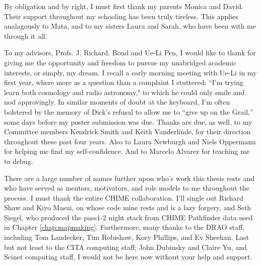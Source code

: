 \begin{acknowledgements}

By obligation and by right, I must first thank my parents Monica and David. Their support throughout my schooling has been truly tireless. This applies analagously to Mata, and to my sisters Laura and Sarah, who have been with me through it all.

To my advisors, Profs. J. Richard. Bond and Ue-Li Pen, I would like to thank for giving me the opportunity and freedom to pursue my unabridged academic interests, or simply, my dream. I recall a early morning meeting with Ue-Li in my first year, where more as a question than a complaint I stuttered: ``I'm trying learn both cosmology and radio astronomy," to which he could only smile and nod approvingly. In similar moments of doubt at the keyboard, I'm often bolstered by the memory of Dick's refusal to allow me to ``give up on the Grail,'' some days before my poster submission was due. Thanks are due, as well, to my Committee members Kendrick Smith and Keith Vanderlinde, for their direction throughout these past four years. Also to Laura Newburgh and Niels Oppermann for helping me find my self-confidence. And to Marcelo Alvarez for teaching me to debug.

There are a large number of names further upon who's work this thesis rests and who have served as mentors, motivators, and role models to me throughout the process. I must thank the entire CHIME collaboration. I'll single out Richard Shaw and Kiyo Masui, on whose code mine rests and is a lazy forgery, and Seth Siegel, who produced the pass1-2 night stack from CHIME Pathfinder data used in Chapter \ref{chap:mapmaking}. Furthermore, many thanks to the DRAO staff, including Tom Landecker, Tim Robishaw, Kory Phillips, and Ev Sheehan. Last but not least to the CITA computing staff; John Dubinsky and Claire Yu, and Scinet computing staff, I would not be here now without your help and support.

\end{acknowledgements}